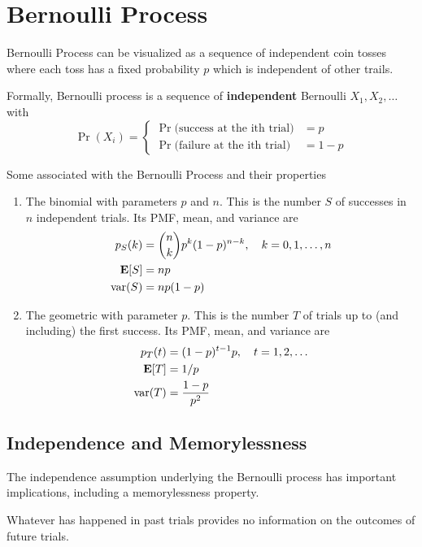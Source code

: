 \section{Bernoulli Process}
Bernoulli Process can be visualized as a sequence of independent coin tosses where each toss has a fixed probability $p$ which is independent of other trails.

Formally, Bernoulli process is a sequence of \textbf{independent} Bernoulli \RV $X_1,X_2,\ldots$ with
\[
    \Pr(X_i) = \begin{cases}
        \Pr(\text{success at the ith trial)} &= p \\
        \Pr(\text{failure at the ith trial)} &= 1-p
    \end{cases}
\]

Some \rv associated with the Bernoulli Process and their properties
\begin{enumerate}
    \item The binomial with parameters $p$ and $n$. This is the number $S$ of successes in $n$ independent trials. Its PMF, mean, and variance are
    \begin{align*}
        p_S(k) &= \binom{n}{k}p^k(1-p)^{n-k}, \quad k = 0,1,\ldots,n \\
        \operatorname{\textbf{E}}[S] &= np \\
        \operatorname{\text{var}}(S)&=np(1-p)
    \end{align*}
    \item The geometric with parameter $p$. This is the number $T$ of trials up to (and including) the first success. Its PMF, mean, and variance are
    \begin{align*}
        p_T(t) &= (1-p)^{t-1}p, \quad t=1,2,\ldots\\
        \operatorname{\textbf{E}}[T]&=1/p\\
        \operatorname{\text{var}}(T)&=\frac{1-p}{p^2}
    \end{align*}
\end{enumerate}

\subsection{Independence and Memorylessness}
The independence assumption underlying the Bernoulli process has important implications, including a memorylessness property.
\begin{definition}[Memorylessness]
    Whatever has happened in past trials provides no information on the outcomes of future trials.
\end{definition}

